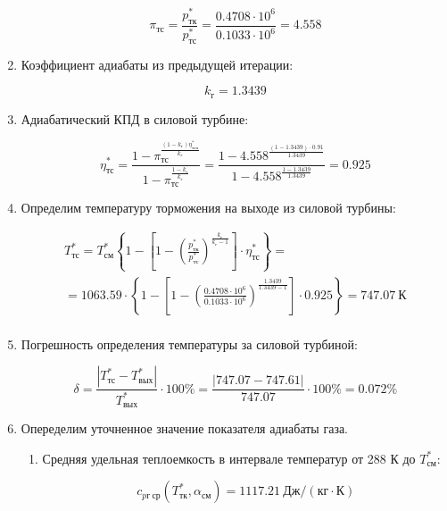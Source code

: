 \documentclass[a4paper,10pt]{article}
\begin{document}
\begin{enumerate}
	\[ \pi_{тс} = \frac{ p_{тк}^* }{ p_{тс}^* } =
			\frac{ 
				0.4708 \cdot 10^6 
			}{ 
				0.1033 \cdot 10^6 
			} = 
			4.558
	\]
	
	\item Коэффициент адиабаты из предыдущей итерации:
	
	\[ k_г = 1.3439 \]
	
	\item Адиабатический КПД в силовой турбине:
	
	\[
	\eta_{тс}^* = \frac{
					1 - \pi_{тс} ^ 
							{\frac{ (1 - k_г ) \eta_{тсп}^* }{ k_г }}
				}{
					1 - \pi_{тс} ^ 
							{\frac{ 1 - k_г }{ k_г }} 
				} = 
			\frac{
				1 - 4.558 ^ 
						{\frac{ (1 - 1.3439 ) \cdot 0.91 }{ 1.3439 }}
			}{
				1 - 4.558 ^ 
						{\frac{ 1 - 1.3439 }{ 1.3439 }} 
			} = 
		0.925
	\]	
	
	\item Определим температуру торможения на выходе из силовой турбины:
	
	\begin{gather*}
	    T_{тс}^* = T_{см}^*
		\left\lbrace
			1 -
			\left[
				1 -
					\left(
						\frac{ p_{тк}^* }{ p_{тс}^* }
					\right) ^ \frac{ k_г }{ k_г - 1 }
			\right] \cdot \eta_{тс}^*
		\right\rbrace =\\
	    = 1063.59 \cdot
		\left\lbrace
			1 -
			\left[
				1 -
					\left(
						\frac{ 0.4708 \cdot 10^6 }{ 0.1033 \cdot 10^6 }
					\right) ^ \frac{ 1.3439 }{ 1.3439 - 1 }
			\right] \cdot 0.925
		\right\rbrace =
	747.07\ К\\
	\end{gather*}
	
	\item Погрешность определения температуры за силовой турбиной:
	
	\[
	\delta = \frac{ 
					\left| T_{тс}^* - T_{вых}^* \right|
				}{ 
					T_{вых}^*
				} \cdot 100 \%= 
		\frac{ 
			\left| 747.07 - 747.61 \right|
		}{ 
			747.07
		} \cdot 100 \% =
	0.072 \%
	\]
	
	\item Опеределим уточненное значение показателя адиабаты газа.
	
	\begin{enumerate}
	
		\item Средняя удельная теплоемкость в интервале температур от 288 К до $ T_{см}^* $:
		
		\[
		c_{pг\ ср} (T_{тк}^*, \alpha_{см}) = 1117.21\ Дж / (кг \cdot К)
		\]
		

\end{enumerate}
\end{enumerate}
\end{document}
